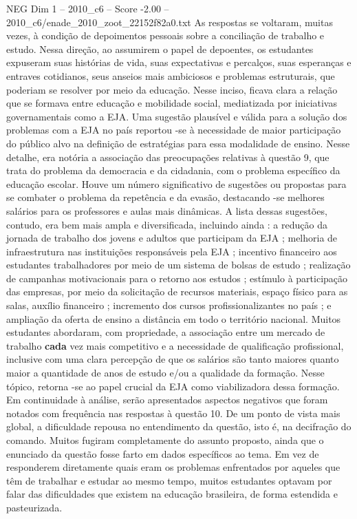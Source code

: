 \begin{textsample}{NEG Dim 1 – 2010\_c6 – Score -2.00 – 2010\_c6/enade\_2010\_zoot\_22152f82a0.txt}
As respostas se voltaram, muitas vezes, à condição de depoimentos pessoais sobre a conciliação de trabalho e estudo.
Nessa direção, ao assumirem o papel de depoentes, os estudantes expuseram suas histórias de vida, suas expectativas e percalços, suas esperanças e entraves cotidianos, seus anseios mais ambiciosos e problemas estruturais, que poderiam se resolver por meio da educação.
Nesse inciso, ficava clara a relação que se formava entre educação e mobilidade social, mediatizada por iniciativas governamentais como a EJA.
Uma sugestão plausível e válida para a solução dos problemas com a EJA no país reportou -se à necessidade de maior participação do público alvo na definição de estratégias para essa modalidade de ensino.
Nesse detalhe, era notória a associação das preocupações relativas à questão 9, que trata do problema da democracia e da cidadania, com o problema específico da educação escolar.
Houve um número significativo de sugestões ou propostas para se combater o problema da repetência e da evasão, destacando -se melhores salários para os professores e aulas mais dinâmicas.
A lista dessas sugestões, contudo, era bem mais ampla e diversificada, incluindo ainda : a redução da jornada de trabalho dos jovens e adultos que participam da EJA ; melhoria de infraestrutura nas instituições responsáveis pela EJA ; incentivo financeiro aos estudantes trabalhadores por meio de um sistema de bolsas de estudo ; realização de campanhas motivacionais para o retorno aos estudos ; estímulo à participação das empresas, por meio da solicitação de recursos materiais, espaço físico para as salas, auxílio financeiro ; incremento dos cursos profissionalizantes no país ; e ampliação da oferta de ensino a distância em todo o território nacional.
Muitos estudantes abordaram, com propriedade, a associação entre um mercado de trabalho \textbf{cada} vez mais competitivo e a necessidade de qualificação profissional, inclusive com uma clara percepção de que os salários são tanto maiores quanto maior a quantidade de anos de estudo e/ou a qualidade da formação.
Nesse tópico, retorna -se ao papel crucial da EJA como viabilizadora dessa formação.
Em continuidade à análise, serão apresentados aspectos negativos que foram notados com frequência nas respostas à questão 10.
De um ponto de vista mais global, a dificuldade repousa no entendimento da questão, isto é, na decifração do comando.
Muitos fugiram completamente do assunto proposto, ainda que o enunciado da questão fosse farto em dados específicos ao tema.
Em vez de responderem diretamente quais eram os problemas enfrentados por aqueles que têm de trabalhar e estudar ao mesmo tempo, muitos estudantes optavam por falar das dificuldades que existem na educação brasileira, de forma estendida e pasteurizada.

\end{textsample}

